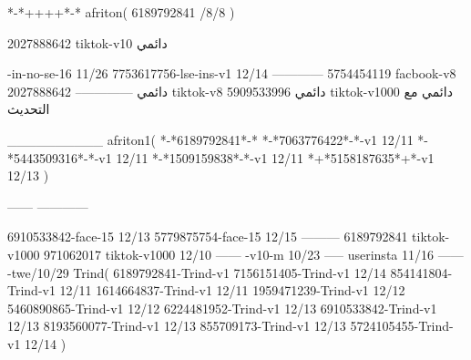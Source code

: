*-*++++*-*
afriton(
6189792841 /8/8
)

2027888642 tiktok-v10
دائمي

-in-no-se-16 11/26
7753617756-lse-ins-v1 12/14
------------
5754454119 facbook-v8
دائمي
--------------
2027888642 tiktok-v8
دائمي
5909533996 tiktok-v1000
دائمي مع التحديث

__________
afriton1(
*-*6189792841*-*
*-*7063776422*-*-v1 12/11
*-*5443509316*-*-v1 12/11
*-*1509159838*-*-v1 12/11
*+*5158187635*+*-v1 12/13
)

------
------------


6910533842-face-15 12/13
5779875754-face-15 12/15
---------
6189792841 tiktok-v1000
971062017 tiktok-v1000 12/10
------
-v10-m 10/23
-----
userinsta 11/16
------
-twe/10/29
Trind(
6189792841-Trind-v1 
7156151405-Trind-v1 12/14
854141804-Trind-v1 12/11
1614664837-Trind-v1 12/11
1959471239-Trind-v1 12/12
5460890865-Trind-v1 12/12
6224481952-Trind-v1 12/13
6910533842-Trind-v1 12/13
8193560077-Trind-v1 12/13
855709173-Trind-v1 12/13
5724105455-Trind-v1 12/14
)
